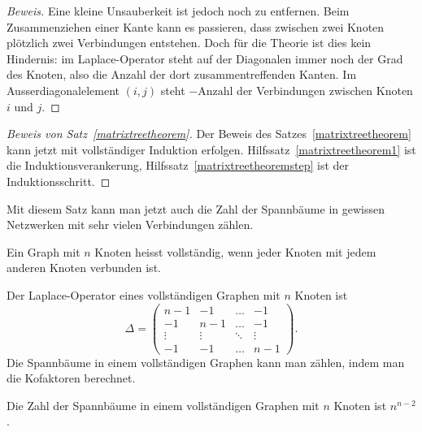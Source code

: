 \begin{proof}[Beweis]
Eine kleine Unsauberkeit ist jedoch noch zu entfernen.
Beim Zusammenziehen einer Kante kann es passieren, dass zwischen zwei
Knoten plötzlich zwei Verbindungen entstehen. Doch für die
Theorie ist dies kein Hindernis: im Laplace-Operator steht
auf der Diagonalen immer noch der Grad des Knoten, also die Anzahl
der dort zusammentreffenden Kanten. Im Ausserdiagonalelement $(i,j)$
steht $-\text{Anzahl}$ der Verbindungen zwischen Knoten $i$ und $j$.
\end{proof}

\begin{proof}[Beweis von Satz~\ref{matrixtreetheorem}]
Der Beweis des Satzes~\ref{matrixtreetheorem} kann jetzt mit vollständiger
Induktion erfolgen.
Hilfssatz~\ref{matrixtreetheorem1} ist die Induktionsverankerung,
Hilfssatz~\ref{matrixtreetheoremstep} ist der Induktionsschritt.
\end{proof}

Mit diesem Satz kann man jetzt auch die Zahl der Spannbäume in gewissen
Netzwerken mit sehr vielen Verbindungen zählen. 
\begin{definition}
Ein Graph mit $n$ Knoten heisst vollständig, wenn jeder Knoten mit
jedem anderen Knoten verbunden ist.
\end{definition}
Der Laplace-Operator eines vollständigen Graphen mit $n$ Knoten ist
\[
\Delta=\begin{pmatrix}
n-1   &  -1  & \dots & -1 \\
 -1   & n-1  & \dots & -1 \\
\vdots&\vdots&\ddots &\vdots\\
 -1   &  -1  &\dots  &n-1
\end{pmatrix}.
\]
Die Spannbäume in einem vollständigen Graphen kann man zählen, indem
man die Kofaktoren berechnet.

\begin{satz}[Cayley]
Die Zahl der Spannbäume in einem vollständigen Graphen mit $n$ 
Knoten ist $n^{n-2}$.
\end{satz}

